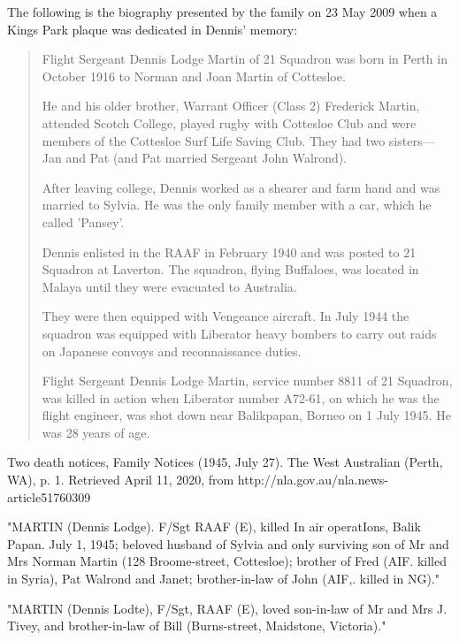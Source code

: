 
The following is the biography presented by the family on 23 May 2009 when a Kings Park plaque was dedicated in Dennis' memory:\cite{KingsParkDennisMartin}

\begin{quotation}
Flight Sergeant Dennis Lodge Martin of 21 Squadron was born in Perth in October 1916 to Norman and Joan Martin of Cottesloe.

He and his older brother, Warrant Officer (Class 2) Frederick Martin, attended Scotch College,
played rugby with Cottesloe Club and were members of the Cottesloe Surf Life Saving Club.
They had two sisters---Jan and Pat (and Pat married Sergeant John Walrond).

After leaving college, Dennis worked as a shearer and farm hand and was married to Sylvia.
He was the only family member with a car, which he called 'Pansey'.

Dennis enlisted in the RAAF in February 1940 and was posted to 21 Squadron at Laverton.
The squadron, flying Buffaloes, was located in Malaya until they were evacuated to Australia.

They were then equipped with Vengeance aircraft. In July 1944 the squadron was equipped with Liberator heavy bombers
to carry out raids on Japanese convoys and reconnaissance duties.

Flight Sergeant Dennis Lodge Martin, service number 8811 of 21 Squadron, was killed in action when Liberator number A72-61,
on which he was the flight engineer, was shot down near Balikpapan, Borneo on 1 July 1945. He was 28 years of age.
\end{quotation}

Two death notices, Family Notices (1945, July 27). The West Australian (Perth, WA), p. 1.
Retrieved April 11, 2020, from http://nla.gov.au/nla.news-article51760309

"MARTIN (Dennis Lodge). F/Sgt RAAF (E), killed In air operatIons, Balik Papan.
July 1, 1945; beloved husband of Sylvia and only surviving son of Mr
and Mrs Norman Martin (128 Broome-street, Cottesloe); brother of Fred (AIF.
killed in Syria), Pat Walrond and Janet; brother-in-law of John (AIF,. killed in NG)."

"MARTIN (Dennis Lodte), F/Sgt, RAAF (E), loved son-in-law of Mr and Mrs J. Tivey, and brother-in-law of Bill (Burns-street, Maidstone, Victoria)."
